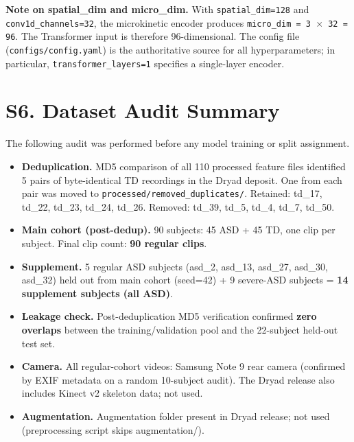 \documentclass[12pt,a4paper]{article}
\begin{document}
\vspace{0.5em}
\noindent
\textbf{Note on spatial\_dim and micro\_dim.}
With \texttt{spatial\_dim=128} and \texttt{conv1d\_channels=32},
the microkinetic encoder produces \texttt{micro\_dim = 3\,$\times$\,32 = 96}.
The Transformer input is therefore 96-dimensional.
The config file (\texttt{configs/config.yaml}) is the authoritative source
for all hyperparameters; in particular, \texttt{transformer\_layers=1}
specifies a single-layer encoder.

\section{S6. Dataset Audit Summary}
\label{sec:s6}

The following audit was performed before any model training or split assignment.

\begin{itemize}
  \item \textbf{Deduplication.} MD5 comparison of all 110 processed feature files
        identified 5 pairs of byte-identical TD recordings in the Dryad deposit.
        One from each pair was moved to \texttt{processed/removed\_duplicates/}.
        Retained: td\_17, td\_22, td\_23, td\_24, td\_26.
        Removed: td\_39, td\_5, td\_4, td\_7, td\_50.

  \item \textbf{Main cohort (post-dedup).} 90 subjects: 45 ASD + 45 TD,
        one clip per subject.
        Final clip count: \textbf{90 regular clips}.

  \item \textbf{Supplement.} 5 regular ASD subjects (asd\_2, asd\_13, asd\_27,
        asd\_30, asd\_32) held out from main cohort (seed=42) + 9 severe-ASD
        subjects = \textbf{14 supplement subjects (all ASD)}.

  \item \textbf{Leakage check.} Post-deduplication MD5 verification confirmed
        \textbf{zero overlaps} between the training/validation pool and the
        22-subject held-out test set.

  \item \textbf{Camera.} All regular-cohort videos: Samsung Note 9 rear camera
        (confirmed by EXIF metadata on a random 10-subject audit).
        The Dryad release also includes Kinect v2 skeleton data; not used.

  \item \textbf{Augmentation.} Augmentation folder present in Dryad release;
        not used (preprocessing script skips augmentation/).
\end{itemize}
\end{document}

